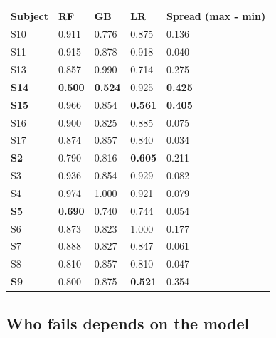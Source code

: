 \documentclass[11pt]{article}
\begin{document}
\begin{longtable}[]{@{}lllll@{}}
\toprule\noalign{}
Subject & RF & GB & LR & Spread (max - min) \\
\midrule\noalign{}
\endhead
\bottomrule\noalign{}
\endlastfoot
S10 & 0.911 & 0.776 & 0.875 & 0.136 \\
S11 & 0.915 & 0.878 & 0.918 & 0.040 \\
S13 & 0.857 & 0.990 & 0.714 & 0.275 \\
\textbf{S14} & \textbf{0.500} & \textbf{0.524} & 0.925 &
\textbf{0.425} \\
\textbf{S15} & 0.966 & 0.854 & \textbf{0.561} & \textbf{0.405} \\
S16 & 0.900 & 0.825 & 0.885 & 0.075 \\
S17 & 0.874 & 0.857 & 0.840 & 0.034 \\
\textbf{S2} & 0.790 & 0.816 & \textbf{0.605} & 0.211 \\
S3 & 0.936 & 0.854 & 0.929 & 0.082 \\
S4 & 0.974 & 1.000 & 0.921 & 0.079 \\
\textbf{S5} & \textbf{0.690} & 0.740 & 0.744 & 0.054 \\
S6 & 0.873 & 0.823 & 1.000 & 0.177 \\
S7 & 0.888 & 0.827 & 0.847 & 0.061 \\
S8 & 0.810 & 0.857 & 0.810 & 0.047 \\
\textbf{S9} & 0.800 & 0.875 & \textbf{0.521} & 0.354 \\
\end{longtable}

\hypertarget{who-fails-depends-on-the-model}{%
\subsection{Who fails depends on the
model}\label{who-fails-depends-on-the-model}}
\end{document}
